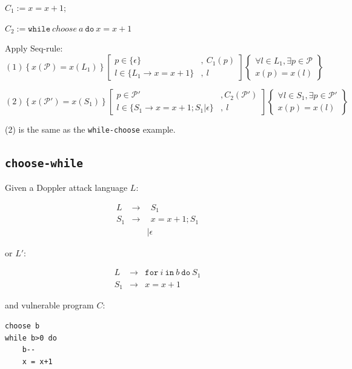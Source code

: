 \documentclass[12pt]{article}
\begin{document}
$C_1 := x=x+1$; 

$C_2 := \texttt{while}~choose~a~\texttt{do}~x=x+1$

Apply Seq-rule:
\[
(1)
\left\{ x(\mathcal{P})=x(L_1) \right\}
\left[
\begin{array}{ll}
p \in \{\epsilon\} & , ~C_1(p) \\
l \in \{L_1 \rightarrow x=x+1\} & , ~l
\end{array}
\right]
\left\{
\begin{array}{c}
\forall l \in L_1 , \exists p \in \mathcal{P} \\
x(p) = x(l)
\end{array}
\right\}
\]

\[
(2)
\left\{ x(\mathcal{P}')=x(S_1) \right\}
\left[
\begin{array}{ll}
p \in \mathcal{P}' & , C_2(\mathcal{P}') \\
l \in \{S_1 \rightarrow x=x+1;S_1|\epsilon\} & , ~l
\end{array}
\right]
\left\{
\begin{array}{c}
\forall l \in S_1 , \exists p \in \mathcal{P}' \\
x(p) = x(l)
\end{array}
\right\}
\]

(2) is the same as the \texttt{while-choose} example.

\subsection{\texttt{choose-while}}
Given a Doppler attack language $L$:

\[
\begin{array}{rrl}
     L & \rightarrow & ~~S_1 \\
     S_1 & \rightarrow & ~~x=x+1 ; S_1\\
      &  & \mid \epsilon
\end{array}
\]

or $L'$:

\[
\begin{array}{rrl}
     L & \rightarrow & \texttt{for}~i~\texttt{in}~b~\texttt{do}~S_1\\
     S_1 & \rightarrow & x=x+1 
\end{array}
\]

and vulnerable program $C$:
\begin{lstlisting}
choose b
while b>0 do
    b--
    x = x+1
\end{lstlisting}
\end{document}
